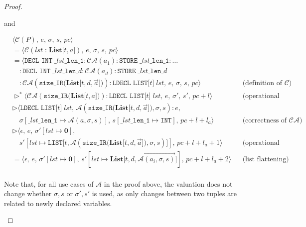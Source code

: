 \documentclass{article}
\begin{document}
\begin{proof}
\begin{itemize}
      and

          \[
              \begin{aligned}
              &\langle \mathcal{C}(P),\, e,\, \sigma,\, s,\, pc \rangle \\
              &= \langle \mathcal{C}(lst \;\texttt{:}\; \textbf{List[$t, a$]}),\, e,\, \sigma,\, s,\, pc \rangle \\
              &= \langle \texttt{DECL INT}\;\texttt{\_$lst$\_len\_1} : \mathcal{CA}(a_1) : \texttt{STORE}\;\texttt{\_$lst$\_len\_1} : \dots \\
              &\quad : \texttt{DECL INT}\;\texttt{\_$lst$\_len\_$d$} : \mathcal{CA}(a_d) : \texttt{STORE}\;\texttt{\_$lst$\_len\_$d$} \\
              &\quad : \mathcal{CA}(\texttt{size\_IR(} \textbf{List[$t,d,\vec{a}$]} \texttt{)} ) : \texttt{LDECL LIST[$t$]}\;lst,\, e,\, \sigma,\, s,\, pc \rangle
              && \text{(definition of } \mathcal{C}\text{)} \\
              &\triangleright^\ast \langle \mathcal{CA}(\texttt{size\_IR(} \textbf{List[$t, a$]} \texttt{)} ) : \texttt{LDECL LIST[$t$]}\;lst,\, e,\, \sigma',\, s',\, pc + l \rangle
              && \text{(operational semantics))} \\
              &\triangleright \langle \texttt{LDECL LIST[$t$]}\;lst,\, \mathcal{A}(\texttt{size\_IR(} \textbf{List[$t, d, \vec{a}$]} \texttt{)}, \sigma, s) : e,\, \\
              &\quad \sigma[\texttt{\_$lst$\_len\_1} \mapsto \mathcal{A}(a, \sigma, s)],\, s[\texttt{\_$lst$\_len\_1} \mapsto \texttt{INT}],\, pc + l + l_a \rangle
              && \text{(correctness of } \mathcal{CA}\text{)} \\
              &\triangleright \langle \epsilon,\, e,\, \sigma'[lst \mapsto \textbf{0}],\, \\
              &\quad s'[lst \mapsto \texttt{LIST[$t, \mathcal{A}(\texttt{size\_IR(} \textbf{List[$t, d, \vec{a}$]} \texttt{)}, \sigma, s)$]}],\, pc + l + l_a + 1\rangle
              && \text{(operational semantics)} \\
              &= \langle \epsilon,\, e,\, \sigma'[lst \mapsto \textbf{0}],\, s'[lst \mapsto \textbf{List[$t, d, \vec{\mathcal{A}(a_i, \sigma, s)}$]}],\,  pc + l + l_a + 2 \rangle
              && \text{(list flattening)} \\ 
              \end{aligned}
          \]

        Note that, for all use cases of $\mathcal{A}$ in the proof above, the valuation does not change whether $\sigma, s$ or $\sigma', s'$ is used, as only changes between two tuples are related to newly declared variables.
  


\end{itemize}
\end{proof}
\end{document}

